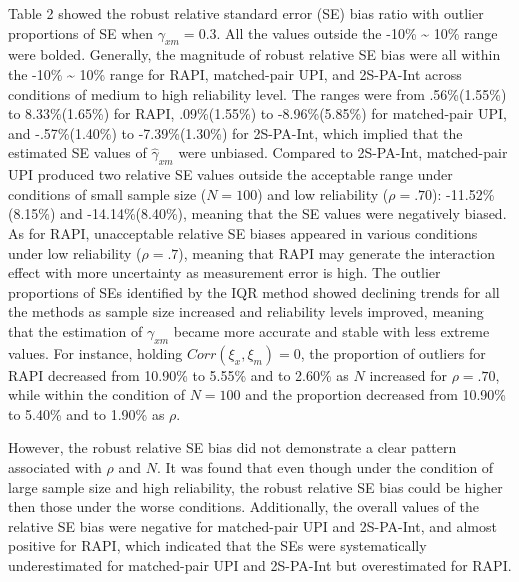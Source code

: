\documentclass[
  man]{apa6}
\begin{document}
Table 2 showed the robust relative standard error (SE) bias ratio with outlier proportions of SE when \(\gamma_{xm} = 0.3\). All the values outside the -10\% \textasciitilde{} 10\% range were bolded. Generally, the magnitude of robust relative SE bias were all within the -10\% \textasciitilde{} 10\% range for RAPI, matched-pair UPI, and 2S-PA-Int across conditions of medium to high reliability level. The ranges were from .56\%(1.55\%) to 8.33\%(1.65\%) for RAPI, .09\%(1.55\%) to -8.96\%(5.85\%) for matched-pair UPI, and -.57\%(1.40\%) to -7.39\%(1.30\%) for 2S-PA-Int, which implied that the estimated SE values of \(\hat{\gamma}_{xm}\) were unbiased. Compared to 2S-PA-Int, matched-pair UPI produced two relative SE values outside the acceptable range under conditions of small sample size (\(\textit{N} = 100\)) and low reliability (\(\rho = .70\)): -11.52\%(8.15\%) and -14.14\%(8.40\%), meaning that the SE values were negatively biased. As for RAPI, unacceptable relative SE biases appeared in various conditions under low reliability (\(\rho = .7\)), meaning that RAPI may generate the interaction effect with more uncertainty as measurement error is high. The outlier proportions of SEs identified by the IQR method showed declining trends for all the methods as sample size increased and reliability levels improved, meaning that the estimation of \(\gamma_{xm}\) became more accurate and stable with less extreme values. For instance, holding \(Corr(\xi_{x}, \xi_{m}) = 0\), the proportion of outliers for RAPI decreased from 10.90\% to 5.55\% and to 2.60\% as \(N\) increased for \(\rho = .70\), while within the condition of \(\textit{N} = 100\) and the proportion decreased from 10.90\% to 5.40\% and to 1.90\% as \(\rho\).

However, the robust relative SE bias did not demonstrate a clear pattern associated with \(\rho\) and \(N\). It was found that even though under the condition of large sample size and high reliability, the robust relative SE bias could be higher then those under the worse conditions. Additionally, the overall values of the relative SE bias were negative for matched-pair UPI and 2S-PA-Int, and almost positive for RAPI, which indicated that the SEs were systematically underestimated for matched-pair UPI and 2S-PA-Int but overestimated for RAPI.
\end{document}
